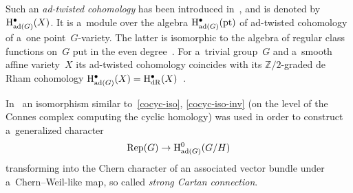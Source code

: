 \documentclass[pdftex]{sigma}
\numberwithin{equation}{section}
\DeclareMathOperator{\ad}{ad}
\begin{document}
Such an \emph{ad-twisted cohomology} has been introduced in~\cite{Masz15}, and is denoted by ${\rm H}^{\bullet}_{\ad(G)}(X)$.
It is a~module over the algebra ${\rm H}^{\bullet}_{\ad(G)}({\rm pt})$ of ad-twisted cohomology of a~one
point~$G$-variety.
The latter is isomorphic to the algebra of regular class functions on~$G$ put in the even degree~\cite{Masz15}.
For a~trivial group~$G$ and a~smooth af\/f\/ine variety~$X$ its ad-twisted cohomology coincides with its
$\mathbb{Z}/2$-graded de Rham cohomology ${\rm H}^{\bullet}_{\ad(G)}(X)={\rm H}^{\bullet}_{\rm
dR}(X)$~\cite{Masz15}.

In~\cite{Masz15} an isomorphism similar to~\eqref{cocyc-iso}, \eqref{cocyc-iso-inv} (on the level of the Connes complex
computing the cyclic homology) was used in order to construct a~generalized character
\begin{gather*}%
{\rm Rep}(G)\rightarrow {\rm H}^{0}_{\ad(G)}(G/H)
\end{gather*}
transforming into the Chern character of an associated vector bundle under a~Chern--Weil-like map, so called
\emph{strong Cartan connection}.
\end{document}
